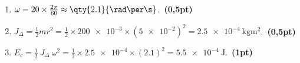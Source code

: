 \begin{enumerate}
    \item $\omega=20 \times \frac{2\pi}{60}\approx\qty{2.1}{\rad\per\s}$.~\textbf{(0,5pt)}
    \item $J_{\Delta}=\frac{1}{2} m r^2=
          \frac{1}{2}\times \num{200e-3} \times (\num{5e-2})^{2}=
          \qty{2.5e-4}{\kg\square\meter}$.~\textbf{(0,5pt)}
    \item $E_{c}=\frac{1}{2} \ J_{\Delta} \ \omega^{2}=
          \frac{1}{2}\times\num{2.5e-4}\times(\num{2.1})^{2}=
          \qty{5.5e-4}{\joule}$.~\textbf{(1pt)}
\end{enumerate}

